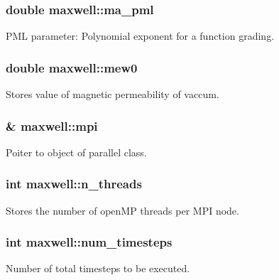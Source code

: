 \subsubsection[{\texorpdfstring{ma\+\_\+pml}{ma_pml}}]{\setlength{\rightskip}{0pt plus 5cm}double maxwell\+::ma\+\_\+pml}\hypertarget{classmaxwell_aa2055ecfd573a345dc94aecc12f37511}{}\label{classmaxwell_aa2055ecfd573a345dc94aecc12f37511}
P\+ML parameter\+: Polynomial exponent for a function grading. 
\subsubsection[{\texorpdfstring{mew0}{mew0}}]{\setlength{\rightskip}{0pt plus 5cm}double maxwell\+::mew0}\hypertarget{classmaxwell_a24f927a857400bd7d6e957366e0514e1}{}\label{classmaxwell_a24f927a857400bd7d6e957366e0514e1}
Stores value of magnetic permeability of vaccum. 
\subsubsection[{\texorpdfstring{mpi}{mpi}}]{\& maxwell\+::mpi}\hypertarget{classmaxwell_a9b16bad0e1e47ea794adbc3fee740c64}{}\label{classmaxwell_a9b16bad0e1e47ea794adbc3fee740c64}
Poiter to object of parallel class. 
\subsubsection[{\texorpdfstring{n\+\_\+threads}{n_threads}}]{\setlength{\rightskip}{0pt plus 5cm}int maxwell\+::n\+\_\+threads}\hypertarget{classmaxwell_a40c465be209366013cfecb984c96fcdb}{}\label{classmaxwell_a40c465be209366013cfecb984c96fcdb}
Stores the number of open\+MP threads per M\+PI node. 
\subsubsection[{\texorpdfstring{num\+\_\+timesteps}{num_timesteps}}]{\setlength{\rightskip}{0pt plus 5cm}int maxwell\+::num\+\_\+timesteps}\hypertarget{classmaxwell_a6282670536b066ba81aba77143676d2b}{}\label{classmaxwell_a6282670536b066ba81aba77143676d2b}
Number of total timesteps to be executed. 
